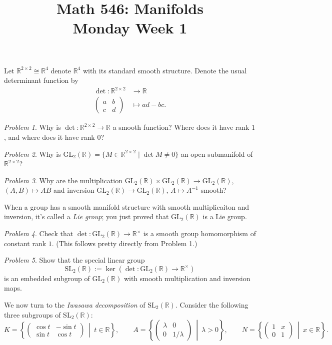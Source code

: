 \documentclass[11pt,twoside]{amsart}
\title{Math 546: Manifolds\\ Monday Week 1}
\theoremstyle{plain}
\theoremstyle{remark}
\newtheorem{prob}{Problem}
\theoremstyle{definition}
\theoremstyle{definition}
\newcommand{\RR}{\mathbb{R}}
\newcommand{\GL}{\mathrm{GL}}
\newcommand{\SL}{\mathrm{SL}}
\begin{document}
\maketitle

Let $\RR^{2\times 2}\cong \RR^4$ denote $\RR^4$ with its standard smooth structure. Denote the usual determinant function by
\[
\begin{aligned}
  \det\colon \RR^{2\times 2}&\longrightarrow \RR\\
  \begin{pmatrix}
  a&b\\c&d
  \end{pmatrix}
  &\longmapsto ad-bc.
\end{aligned}
\]

\begin{prob}
Why is $\det\colon \RR^{2\times 2}\to \RR$ a smooth function? Where does it have rank $1$, and where does it have rank $0$?
\end{prob}

\begin{prob}
Why is $\GL_2(\RR) = \{M\in \RR^{2\times 2}\mid \det M\ne 0\}$ an open submanifold of $\RR^{2\times 2}$?
\end{prob}

\begin{prob}
Why are the multiplication $\GL_2(\RR)\times \GL_2(\RR)\to \GL_2(\RR)$, $(A,B)\mapsto AB$ and inversion $\GL_2(\RR)\to \GL_2(\RR)$, $A\mapsto A^{-1}$ smooth?
\end{prob}

When a group has a smooth manifold structure with smooth multiplicaiton and inversion, it's called a \emph{Lie group}; you just proved that $\GL_2(\RR)$ is a Lie group.

\begin{prob}
Check that $\det\colon \GL_2(\RR)\to \RR^{\times}$ is a smooth group homomorphism of constant rank $1$. (This follows pretty directly from Problem 1.)
\end{prob}

\begin{prob}
Show that the special linear group
\[
  \SL_2(\RR) := \ker(\det\colon \GL_2(\RR)\to \RR^\times)
\]
is an embedded subgroup of $\GL_2(\RR)$ with smooth multiplication and inversion maps.
\end{prob}

We now turn to the \emph{Iwasawa decomposition} of $\SL_2(\RR)$. Consider the following three subgroups of $\SL_2(\RR)$:
\[
  K = \left\{\begin{pmatrix}
  \cos t&-\sin t\\ \sin t&\cos t
  \end{pmatrix}~\middle|~ t\in \RR\right\},\qquad A = \left\{\begin{pmatrix}
  \lambda &0\\ 0&1/\lambda
  \end{pmatrix} ~\middle|~ \lambda>0\right\},\qquad N = \left\{\begin{pmatrix}
  1&x\\ 0&1
  \end{pmatrix}~\middle|~ x\in \RR\right\}.
\]
\end{document}
